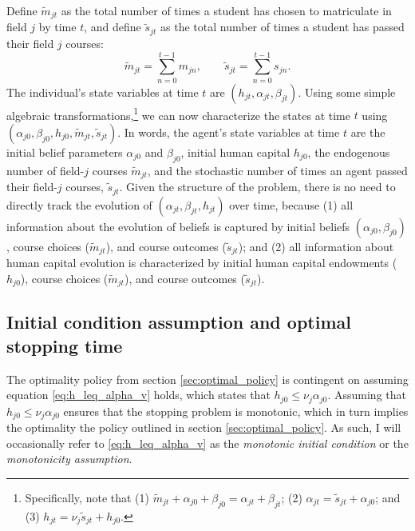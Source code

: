\documentclass[11 pt]{article}
\newcommand{\study}{m} %
\newcommand{\pass}{s}
\newcommand*{\ks}[1][t]{\tilde{\pass}_{j #1}}
\begin{document}
Define $\tilde{\study}_{jt}$ as the total number of times a student has chosen to matriculate in field $j$ by time $t$, and define $\tilde{s}_{jt}$ as the total number of times a student has passed their field $j$ courses:
\begin{equation}\label{eq:def_totals}
     \tilde{\study}_{jt} = \sum_{n=0}^{t-1} \study_{jn}, \quad \quad
     \tilde{\pass}_{jt} = \sum_{n=0}^{t-1} \pass_{jn}.
\end{equation} 
The individual's state variables at time $t$ are $(h_{jt}, \alpha_{jt}, \beta_{jt})$. 
Using some simple algebraic transformations,\footnote{
    Specifically, note that (1) $\tilde{\study}_{jt} + \alpha_{j0} + \beta_{j0} = \alpha_{jt} + \beta_{jt}$; (2) $\alpha_{jt} = \tilde{\pass}_{jt} + \alpha_{j0}$; and (3) $h_{jt} = \nu_j \tilde{s}_{jt} + h_{j0}$.
} we can now characterize the states at time $t$ using $(\alpha_{j0}, \beta_{j0}, h_{j0}, \tilde{\study}_{jt}, \tilde{\pass}_{jt})$.
In words, the agent's state variables at time $t$ are the initial belief parameters $\alpha_{j0}$ and $\beta_{j0}$, initial human capital $h_{j0}$, the endogenous number of field-$j$ courses $\tilde{\study}_{jt}$, and the stochastic number of times an agent passed their field-$j$ courses, $\ks$.
Given the structure of the problem, there is no need to directly track the evolution of $(\alpha_{jt}, \beta_{jt}, h_{jt})$ over time, because (1) all information about the evolution of beliefs is captured by initial beliefs $(\alpha_{j0}, \beta_{j0})$, course choices ($\tilde{\study}_{jt}$), and course outcomes ($\tilde{\pass}_{jt}$); and (2) all information about human capital evolution is characterized by initial human capital endowments ($h_{j0}$), course choices ($\tilde{\study}_{jt}$), and course outcomes ($\tilde{\pass}_{jt}$). 


\subsection{Initial condition assumption and optimal stopping time}\label{sec:initial_condition}


The optimality policy from section \ref{sec:optimal_policy} is contingent on assuming equation \eqref{eq:h_leq_alpha_v} holds, which states that $h_{j0} \leq \nu_j \alpha_{j0}$. 
Assuming that $h_{j0} \leq \nu_j \alpha_{j0}$ ensures that the stopping problem is monotonic, which in turn implies the optimality the policy outlined in section \ref{sec:optimal_policy}.
As such, I will occasionally refer to \eqref{eq:h_leq_alpha_v} as the \emph{monotonic initial condition} or the \emph{monotonicity assumption}. 
\end{document}
